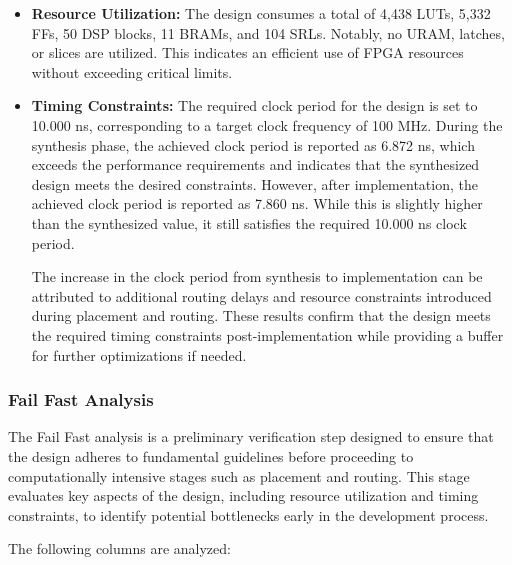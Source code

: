 \documentclass{article}
\begin{document}
\begin{itemize}
    \item \textbf{Resource Utilization:} The design consumes a total of 4,438 LUTs, 5,332 FFs, 50 DSP blocks, 11 BRAMs, and 104 SRLs. Notably, no URAM, latches, or slices are utilized. This indicates an efficient use of FPGA resources without exceeding critical limits.
    \item \textbf{Timing Constraints:}
    The required clock period for the design is set to 10.000 ns, corresponding to a target clock frequency of 100 MHz. During the synthesis phase, the achieved clock period is reported as 6.872 ns, which exceeds the performance requirements and indicates that the synthesized design meets the desired constraints. However, after implementation, the achieved clock period is reported as 7.860 ns. While this is slightly higher than the synthesized value, it still satisfies the required 10.000 ns clock period. 
    
    The increase in the clock period from synthesis to implementation can be attributed to additional routing delays and resource constraints introduced during placement and routing. These results confirm that the design meets the required timing constraints post-implementation while providing a buffer for further optimizations if needed.
    
\end{itemize}

\subsubsection{Fail Fast Analysis}

The Fail Fast analysis is a preliminary verification step designed to ensure that the design adheres to fundamental guidelines before proceeding to computationally intensive stages such as placement and routing. This stage evaluates key aspects of the design, including resource utilization and timing constraints, to identify potential bottlenecks early in the development process.

The following columns are analyzed:
\end{document}
